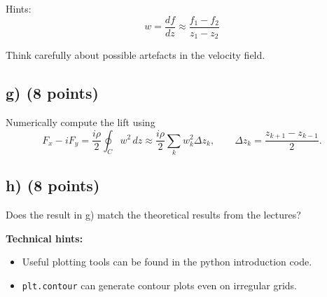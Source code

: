 \documentclass[11pt,a4paper]{article}
\begin{document}
Hints:
\[
w = \frac{df}{dz} \approx \frac{f_1 - f_2}{z_1 - z_2}
\]

Think carefully about possible artefacts in the velocity field.

\subsection*{g) (8 points)}

Numerically compute the lift using
\[
F_x - iF_y
=
\frac{i\rho}{2}
\oint_C w^2 \, dz
\approx
\frac{i\rho}{2}
\sum_k w_k^2 \Delta z_k,
\qquad
\Delta z_k = \frac{z_{k+1} - z_{k-1}}{2}.
\]

\subsection*{h) (8 points)}

Does the result in g) match the theoretical results from the lectures?

\vspace{1em}

\noindent
\textbf{Technical hints:}
\begin{itemize}
\item Useful plotting tools can be found in the python introduction code.
\item \texttt{plt.contour} can generate contour plots even on irregular grids.
\end{itemize}
\end{document}
